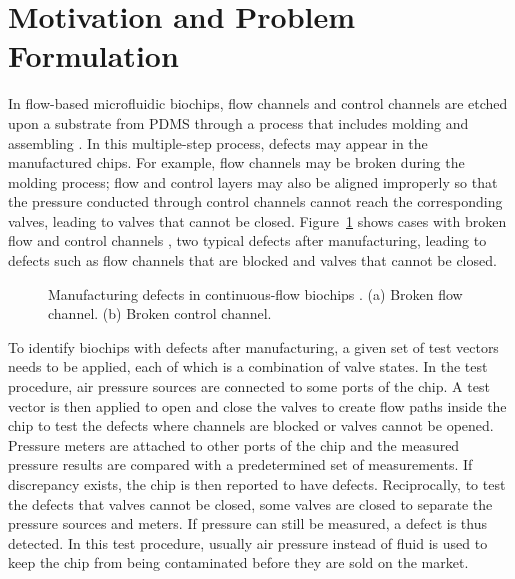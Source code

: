 \section{Motivation and Problem Formulation}\label{sec:motivation}

In flow-based microfluidic biochips, flow channels and control channels are
etched upon a substrate from PDMS through a process that includes molding and
assembling \cite{C2LC40258K}. 
In this multiple-step process, defects may appear in the manufactured chips.
For example, flow channels may be broken during the molding process; flow
and control layers may also be aligned improperly so that the pressure conducted
through control channels cannot reach the corresponding valves, leading
to valves that cannot be closed.  Figure~\ref{fig:defects} shows cases with
broken flow and control channels \cite{HuYHC14}, two typical defects after
manufacturing, leading to defects such as flow channels that are blocked and
valves that cannot be closed.

\begin{figure}
\figurefontsize
\centering

\caption{Manufacturing defects in continuous-flow biochips \cite{HuYHC14}. (a)
Broken flow channel. (b) Broken control channel.}
\label{fig:defects}
\end{figure}

To identify biochips with defects after manufacturing, a given set of test
vectors needs to be applied, each of which is a combination of valve states.
In the test procedure, air pressure sources are connected to some ports of the
chip.  A test vector is then applied to open and close the valves to create
flow paths inside the chip to test the defects where channels are blocked or
valves cannot be opened.  Pressure meters are attached to other ports of the
chip and the measured pressure results are compared with a predetermined set
of measurements. If discrepancy exists, the chip is then reported to have
defects. Reciprocally, to test the defects that valves cannot be closed, some
valves are closed to separate the pressure sources and meters. If pressure can
still be measured, a defect is thus detected.  In this test procedure, usually
air pressure instead of fluid is used to keep the chip from being contaminated
before they are sold on the market.


